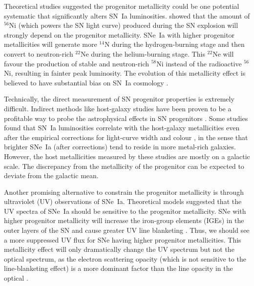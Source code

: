 \documentclass[useAMS,usenatbib]{mn2e}
\begin{document}
Theoretical studies suggested the progenitor metallicity could be one potential systematic that significantly alters SN~Ia luminosities. \citet{2003ApJ...590L..83T} showed that the amount of $^{56}$Ni (which powers the SN light curve) produced during the SN explosion will strongly depend on the progenitor metallicity. SNe~Ia with higher progenitor metallicities will generate more $^{14}$N during the hydrogen-burning stage and then convert to neutron-rich $^{22}$Ne during the helium-burning stage. This $^{22}$Ne will favour the production of stable and neutron-rich $^{58}$Ni instead of the radioactive $^{56}$Ni, resulting in fainter peak luminosity. The evolution of this metallicity effect is believed to have substantial bias on SN~Ia cosmology \citep[e.g.,][]{2006astro.ph..8324P}.

Technically, the direct measurement of SN progenitor properties is extremely difficult. Indirect methods like host-galaxy studies have been proven to be a profitable way to probe the astrophysical effects in SN progenitors \citep[e.g.,][]{2010ApJ...715..743K,2010ApJ...722..566L,2010MNRAS.406..782S,2011ApJ...743..172D,2013ApJ...770..108C,2014MNRAS.438.1391P}. Some studies found that SN~Ia luminosities correlate with the host-galaxy metallicities even after the empirical corrections for light-curve width and colour \citep[e.g.,][]{2011ApJ...743..172D,2013ApJ...770..108C,2014MNRAS.438.1391P}, in the sense that brighter SNe~Ia (after corrections) tend to reside in more metal-rich galaxies. However, the host metallicities measured by these studies are mostly on a galactic scale. The discrepancy from the metallicity of the progenitor can be expected to deviate from the galactic mean. 

Another promising alternative to constrain the progenitor metallicity is through ultraviolet (UV) observations of SNe~Ia. Theoretical models suggested that the UV spectra of SNe~Ia should be sensitive to the progenitor metallicity. SNe with higher progenitor metallicity will increase the iron-group elements (IGEs) in the outer layers of the SN and cause greater UV line blanketing \citep[e.g.,][]{1998ApJ...495..617H,2000ApJ...530..966L}. Thus, we should see a more suppressed UV flux for SNe having higher progenitor metallicities. This metallicity effect will only dramatically change the UV spectrum but not the optical spectrum, as the electron scattering opacity (which is not sensitive to the line-blanketing effect) is a more dominant factor than the line opacity in the optical \citep[e.g.,][]{2008ApJ...674...51E}.
\end{document}
